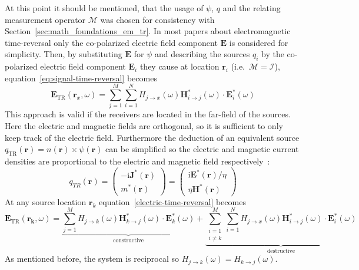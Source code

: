 At this point it should be mentioned, that the usage of \(\psi \), \(q\) and the relating measurement operator \(\mathcal{M}\) was chosen for consistency with Section~\ref{sec:math_foundations_em_tr}.
In most papers about electromagnetic time-reversal only the co-polarized electric field component \(\bm{E}\) is considered for simplicity.
Then, by substituting \(\bm{E}\) for \(\psi \) and describing the sources \(q_i\) by the co-polarized electric field component \(\bm{E}_i\) they cause at location \(\bm{r}_i\) (i.e.~\(\mathcal{M}=\mathcal{I}\)), equation~\eqref{eq:signal-time-reversal} becomes
\begin{equation}\label{electric-time-reversal}
    \bm{E}_{\text{TR}}(\bm{r}_x, \omega) = \sum_{j=1}^{M} \sum_{i=1}^{N} H_{j\rightarrow x}(\omega )  \bm{H}^*_{i\rightarrow j}(\omega) \cdot \bm{E}^*_i(\omega)
\end{equation}
This approach is valid if the receivers are located in the far-field of the sources.
Here the electric and magnetic fields are orthogonal, so it is sufficient to only keep track of the electric field.
Furthermore the deduction of an equivalent source \(q_{\text{TR}}(\bm{r}) = n(\bm{r}) \times \psi(\bm{r})\) can be simplified so the electric and magnetic current densities are proportional to the electric and magnetic field respectively~\parencite{de_rosny_theory_2010}:
\begin{equation}
    q_{T R}(\bm{r})= \begin{pmatrix}
        -\mathrm{i} \bm{J}^*(\bm{r}) \\
        m^*(\bm{r})
    \end{pmatrix} =\left(\begin{array}{c}
        \mathrm{i} \bm{E}^*(\bm{r}) / \eta \\
        \eta \bm{H}^*(\bm{r})
        \end{array}\right)
\end{equation}
At any source location \(\bm{r}_k\) equation~\eqref{electric-time-reversal} becomes
\begin{equation}\label{electric-time-reversal-source}
    \bm{E}_{\text{TR}}(\bm{r_k}, \omega) = \underbrace{\sum_{j=1}^{M} H_{j\rightarrow k}(\omega) \bm{H}^*_{k\rightarrow j}(\omega) \cdot \bm{E}^*_k(\omega)}_{\text{constructive}} + \underbrace{\sum_{\substack{i=1 \\ i \neq k}}^{M} \sum_{i=1}^{N} H_{j\rightarrow x}(\omega ) \bm{H}^*_{i\rightarrow j}(\omega) \cdot \bm{E}^*_i(\omega)}_{\text{destructive}}
\end{equation}
As mentioned before, the system is reciprocal so \(H_{j\rightarrow k}(\omega )= H_{k\rightarrow j}(\omega )\). 
